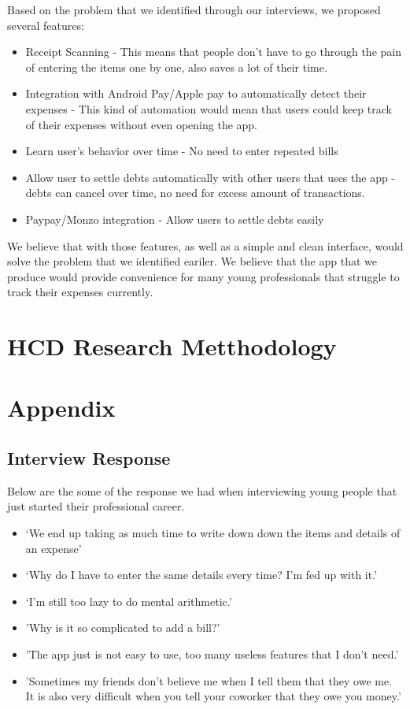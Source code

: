\documentclass[a4wide, 11pt]{article}
\begin{document}
Based on the problem that we identified through our interviews, we proposed several features:
\begin{itemize}
\item Receipt Scanning - This means that people don't have to go through the pain of entering the items one by one, also saves a lot of their time.
\item Integration with Android Pay/Apple pay to automatically detect their expenses - This kind of automation would mean that users could keep track of their expenses without even opening the app.
\item Learn user's behavior over time - No need to enter repeated bills
\item Allow user to settle debts automatically with other users that uses the app - debts can cancel over time, no need for excess amount of transactions.
\item Paypay/Monzo integration - Allow users to settle debts easily
\end{itemize} 

We believe that with those features, as well as a simple and clean interface, would solve the problem that we identified eariler. We believe that the app that we produce would provide convenience for many young professionals that struggle to track their expenses currently.

\section{HCD Research Metthodology}

\newpage
\section{Appendix}

\subsection{Interview Response}
\label{intRes}
Below are the some of the response we had when interviewing young people that just started their professional career.

\begin{itemize}
  \item ‘We end up taking as much time to write down down the items and details of an expense’
  \item ‘Why do I have to enter the same details every time? I'm fed up with it.’
  \item ‘I’m still too lazy to do mental arithmetic.’
  \item 'Why is it so complicated to add a bill?'
  \item 'The app just is not easy to use, too many useless features that I don't need.'
  \item 'Sometimes my friends don't believe me when I tell them that they owe me. It is also very difficult when you tell your coworker that they owe you money.'
\end{itemize}
\end{document}
